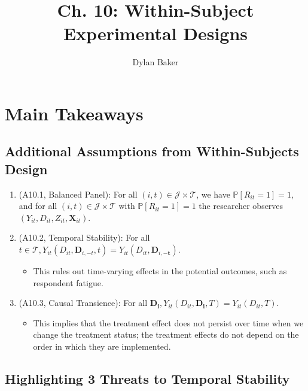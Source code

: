 \documentclass[10pt]{article}
\title{Ch. 10: Within-Subject Experimental Designs}
\author{Dylan Baker}
\begin{document}
\maketitle

\tableofcontents


\section{Main Takeaways}

\subsection{Additional Assumptions from Within-Subjects Design}


\begin{enumerate}
    \item (A10.1, Balanced Panel): For all $(i, t) \in \mathcal{J} \times \mathcal{T}$, we have $\mathbb{P}\left[R_{i t}=1\right]=1$, and for all $(i, t) \in \mathcal{J} \times \mathcal{T}$ with $\mathbb{P}\left[R_{i t}=1\right]=1$ the researcher observes $\left(Y_{i t}, D_{i t}, Z_{i t}, \boldsymbol{X}_{i t}\right)$.
    \item (A10.2, Temporal Stability): For all $t \in \mathcal{T}, Y_{i t}\left(D_{i t}, \boldsymbol{D}_{i,-t}, t\right)=Y_{i t}\left(D_{i t}, \boldsymbol{D}_{i,-\boldsymbol{t}}\right)$.
        \begin{itemize}
            \item This rules out time-varying effects in the potential outcomes, 
                such as respondent fatigue.
        \end{itemize}
    \item (A10.3, Causal Transience): For all $\boldsymbol{D}_{\boldsymbol{i}}, Y_{i t}\left(D_{i t}, \boldsymbol{D}_{\boldsymbol{i}}, T\right)=Y_{i t}\left(D_{i t}, T\right)$.
        \begin{itemize}
            \item This implies that the treatment effect does not persist over time 
                when we change the treatment status; the treatment effects 
                do not depend on the order in which they are implemented.
        \end{itemize}
\end{enumerate}

\subsection{Highlighting 3 Threats to Temporal Stability}
\end{document}

